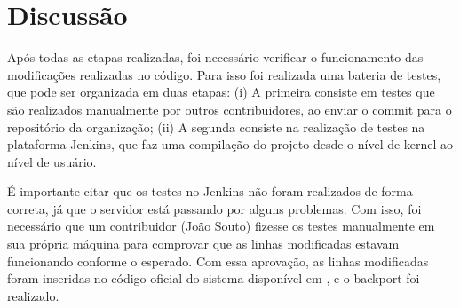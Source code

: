 \section{Discussão}

Após todas as etapas realizadas, foi necessário verificar o funcionamento das modificações realizadas no código. Para isso foi realizada uma bateria de testes, que 
pode ser organizada em duas etapas: (i) A primeira consiste em testes que são realizados manualmente por outros contribuidores, ao enviar o commit para o repositório 
da organização; (ii) A segunda consiste na realização de testes na plataforma Jenkins, que faz uma compilação do projeto desde o nível de kernel ao nível de usuário. 

É importante citar que os testes no Jenkins não foram realizados de forma correta, já que o servidor está passando por alguns problemas. Com isso, foi necessário que
um contribuidor (João Souto) fizesse os testes manualmente em sua própria máquina para comprovar que as linhas modificadas estavam funcionando conforme o esperado. Com 
essa aprovação, as linhas modificadas foram inseridas no código oficial do sistema disponível em \cite{SolucaoInstrucoesDOWNGrade}, e o backport foi realizado. 